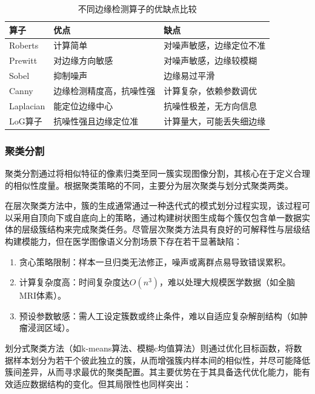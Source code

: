\renewcommand{\tabularxcolumn}[1]{m{#1}}
\begin{table}[!htbp]
\centering
\caption{不同边缘检测算子的优缺点比较}
\label{tab:edge_detectors}
\begin{tabularx}{\textwidth}{@{}C C C@{}}
\toprule
\textbf{算子} & \textbf{优点} & \textbf{缺点} \\
\midrule
Roberts & 计算简单 & 对噪声敏感，边缘定位不准 \\
\addlinespace
Prewitt & 对边缘方向敏感 & 对噪声敏感，边缘较模糊 \\
\addlinespace
Sobel & 抑制噪声 & 边缘易过平滑\\
\addlinespace
Canny & 边缘检测精度高，抗噪性强 & 计算复杂，依赖参数调优\\
\addlinespace
Laplacian & 能定位边缘中心 & 抗噪性极差，无方向信息 \\
\addlinespace
LoG算子 & 抗噪性强且边缘定位准 & 计算量大，可能丢失细边缘 \\
\bottomrule
\end{tabularx}
\end{table}

\subsubsection{聚类分割}

聚类分割通过将相似特征的像素归类至同一簇实现图像分割，其核心在于定义合理的相似性度量。根据聚类策略的不同，主要分为层次聚类与划分式聚类两类。

在层次聚类方法中，簇的生成通常通过一种迭代式的模式划分过程实现，该过程可以采用自顶向下或自底向上的策略，通过构建树状图生成每个簇仅包含单一数据实体的层级簇结构来完成聚类任务。尽管层次聚类方法具有良好的可解释性与层级结构建模能力，但在医学图像语义分割场景下存在若干显著缺陷：

\begin{enumerate}
    \item 贪心策略限制：样本一旦归类无法修正，噪声或离群点易导致错误累积。
    \item 计算复杂度高：时间复杂度达$O(n^3)$，难以处理大规模医学数据（如全脑MRI体素）。
    \item 预设参数敏感：需人工设定簇数或终止条件，难以自适应复杂解剖结构（如肿瘤浸润区域）。
\end{enumerate}

划分式聚类方法（如k-means算法、模糊c均值算法）则通过优化目标函数，将数据样本划分为若干个彼此独立的簇，从而增强簇内样本间的相似性，并尽可能降低簇间差异，从而寻求最优的聚类配置。其主要优势在于其具备迭代优化能力，能有效适应数据结构的变化。但其局限性也同样突出：

